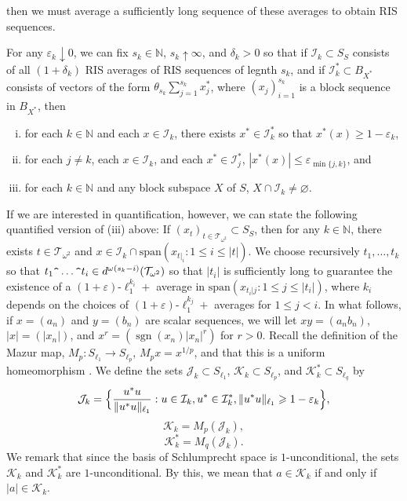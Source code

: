 \documentclass[12pt]{amsart}
\theoremstyle{definition}
\newcommand{\nn}{\mathbb{N}}
\newcommand{\kkk}{\mathcal{K}}
\newcommand{\ttt}{\mathcal{T}}
\newcommand{\iii}{\mathcal{I}}
\newcommand{\jjj}{\mathcal{J}}
\DeclareMathOperator{\sgn}{sgn}
\begin{document}
then we must average a sufficiently long sequence of these averages to obtain RIS sequences.  





For any $\varepsilon_k\downarrow 0$, we can fix $s_k\in \nn$, $s_k\uparrow \infty$, and $\delta_k>0$ so that if $\iii_k\subset S_S$ consists of all $(1+\delta_k)$ RIS averages of RIS sequences of legnth $s_k$, and if $\iii_k^*\subset B_{X^*}$ consists of vectors of the form $\theta_{s_k}\sum_{j=1}^{s_k}x^*_j$, where $(x_j)_{i=1}^{s_k}$ is a block sequence in $B_{X^*}$, then \begin{enumerate}[(i)]\item for each $k\in \nn$ and each $x\in \iii_k$, there exists $x^*\in \iii_k^*$ so that $x^*(x)\geqslant 1-\varepsilon_k$, \item for each $j\neq k$, each $x\in \iii_k$, and each $x^*\in \iii_j^*$, $|x^*(x)|\leqslant\varepsilon_{\min \{j,k\}}$, and \item for each $k\in \nn$ and any block subspace $X$ of $S$, $X\cap \iii_k\neq \varnothing$. 

\end{enumerate}

If we are interested in quantification, however, we can state the following quantified version of (iii) above: If $(x_t)_{t\in \ttt_{\omega^2}}\subset S_S$, then for any $k\in \nn$, there exists $t\in \ttt_{\omega^2}$ and $x\in \iii_k\cap \text{span}(x_{t|_i}:1\leqslant i\leqslant |t|)$.  We choose recursively $t_1, \ldots, t_k$ so that $t_1\verb!^!\ldots \verb!^!t_i\in d^{\omega(s_k-i)}(\ttt_{\omega^2})$ so that $|t_i|$ is sufficiently long to guarantee the existence of a $(1+\varepsilon)$-$\ell_1^{k_i}+$ average in $\text{span}(x_{t_i|j}:1\leqslant j\leqslant |t_i|)$, where $k_i$ depends on the choices of $(1+\varepsilon)$-$\ell_1^{k_j}+$ averages for $1\leqslant j<i$.  In what follows, if $x=(a_n)$ and $y=(b_n)$ are scalar sequences, we will let $xy=(a_nb_n)$, $|x|=(|x_n|)$, and $x^r=(\sgn(x_n) |x_n|^r)$ for $r>0$.  Recall the definition of the Mazur map, $M_p:S_{\ell_1}\to S_{\ell_p}$, $M_px= x^{1/p}$, and that this is a uniform homeomorphism \cite{R}.  We define the sets $\jjj_k\subset S_{\ell_1}$, $\kkk_k\subset S_{\ell_p}$, and $\kkk_k^*\subset S_{\ell_q}$ by $$\jjj_k=\Bigl\{\frac{u^*u}{\|u^*u\|_{\ell_1}}: u\in \iii_k, u^*\in \iii^*_k, \|u^*u\|_{\ell_1}\geqslant 1-\varepsilon_k\Bigr\},$$ $$\kkk_k= M_p(\jjj_k),$$ $$\kkk^*_k= M_q(\jjj_k).$$  We remark that since the basis of Schlumprecht space is $1$-unconditional, the sets $\kkk_k$ and $\kkk_k^*$ are $1$-unconditional.  By this, we mean that $a\in \kkk_k$ if and only if $|a|\in \kkk_k$.  
\end{document}
